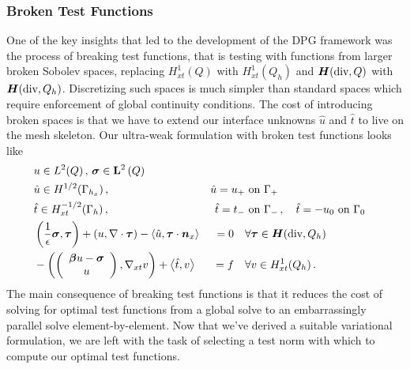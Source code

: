\documentclass{article}
\theoremstyle{definition}
\theoremstyle{remark}
\begin{document}
\subsubsection{Broken Test Functions}
One of the key insights that led to the development of the DPG framework was the process of breaking test functions, 
that is testing with functions from larger broken Sobolev spaces, replacing $H^1_{xt}(Q)$ with  $H^1_{xt}(Q_h)$ 
and $\mbox{\boldmath $H$}(\text{div},Q)$ with $\mbox{\boldmath $H$}(\text{div},Q_h)$.
Discretizing such spaces is much simpler than standard spaces which require enforcement of global continuity conditions.
The cost of introducing broken spaces is that we have to extend our interface unknowns $\hat u$ and $\hat t$ 
to live on the mesh skeleton. %
Our ultra-weak formulation with broken test functions looks like
\begin{equation}
\label{eq:confusionUltraWeakBrokenBF}
	\begin{aligned}
		&u\in L^2(Q)\,,\,\boldsymbol\sigma\in\mathbf{L}^2\left( Q \right)\\
		&\hat u\in H^{1/2}(\Gamma_{h_x})\,,\,&\hat u=u_+&\text{ on }\Gamma_+\\
		&\hat t\in H^{-1/2}_{xt}(\Gamma_h)\,,\,&\hat t=t_-&\text{ on }\Gamma_-\,,\quad\hat t=-u_0\text{ on }\Gamma_0\\
		&\left( \frac{1}{\epsilon}\boldsymbol\sigma,\boldsymbol\tau \right)+\left( u,\nabla\cdot\boldsymbol\tau \right)-\left\langle \hat u,\boldsymbol\tau\cdot\boldsymbol n_x \right\rangle&=0\quad&\forall\boldsymbol\tau\in\mbox{\boldmath $H$}(\text{div},Q_h)\\
		&-\left( \left( \begin{array}{c} \boldsymbol\beta u-\boldsymbol\sigma\\ u\\ \end{array} \right),\nabla_{xt} v \right)+\left\langle \hat t,v \right\rangle&=f\quad&\forall v\in H^1_{xt}(Q_h)\,.
	\end{aligned}
\end{equation}
The main consequence of breaking test functions is that it reduces the cost of solving for optimal test functions from a global solve 
to an embarrassingly parallel solve element-by-element.
Now that we've derived a suitable variational formulation, we are left with the task of selecting a test norm with which to compute our optimal test functions.
\end{document}
